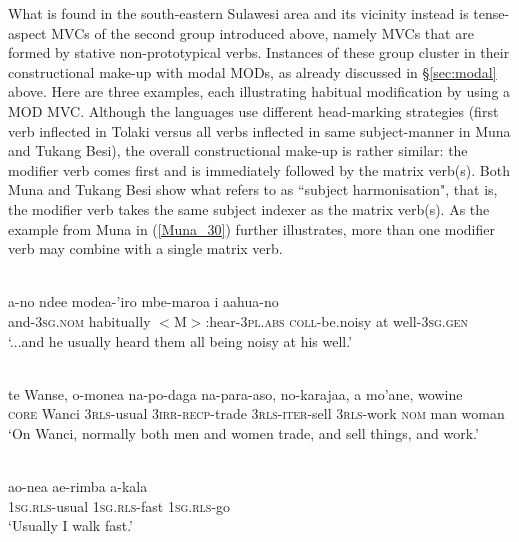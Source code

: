 What is found in the south-eastern Sulawesi area and its vicinity instead is tense-aspect MVCs of the second group introduced above, namely MVCs that are formed by stative non-prototypical verbs. Instances of these group cluster in their constructional make-up with modal MODs, as already discussed in §\ref{sec:modal} above. Here are three examples, each illustrating habitual modification by using a MOD MVC. Although the languages use different head-marking strategies (first verb inflected in Tolaki versus all verbs inflected in same subject-manner in Muna and Tukang Besi), the overall constructional make-up is rather similar: the modifier verb comes first and is immediately followed by the matrix verb(s). Both Muna and Tukang Besi show what \citet{vandenberg1989} refers to as ``subject harmonisation", that is, the modifier verb takes the same subject indexer as the matrix verb(s). As the example from Muna in (\ref{Muna_30}) further illustrates, more than one modifier verb may combine with a single matrix verb.

\ea \label{Tolaki_39}
\\
\gll a-no ndee modea-'iro mbe-maroa i aahua-no\\
and-3\textsc{sg}.\textsc{nom} habitually $<$M$>$:hear-3\textsc{pl}.\textsc{abs} \textsc{coll}-be.noisy at well-3\textsc{sg}.\textsc{gen}\\
\glft `...and he usually heard them all being noisy at his well.'\\
\z

\ea \label{Tukang_62}
\\
\gll te Wanse, o-monea na-po-daga na-para-aso, no-karajaa, a mo'ane, wowine \\
\textsc{core} Wanci 3\textsc{rls}-usual 3\textsc{irr}-\textsc{recp}-trade 3\textsc{rls}-\textsc{iter}-sell 3\textsc{rls}-work \textsc{nom} man woman \\
\glft `On Wanci, normally both men and women trade, and sell things, and work.' \\ 
\z

\ea \label{Muna_30}
\\
\gll ao-nea ae-rimba a-kala \\
1\textsc{sg}.\textsc{rls}-usual 1\textsc{sg}.\textsc{rls}-fast 1\textsc{sg}.\textsc{rls}-go \\
\glft `Usually I walk fast.'\\ 
\z

